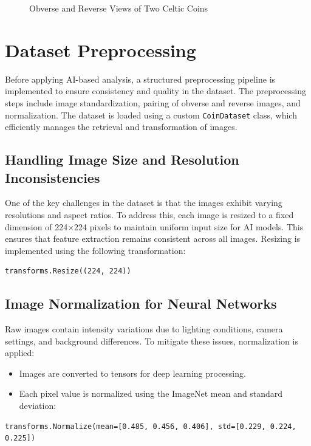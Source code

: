 \documentclass[nolibertine, english, algorithm, nomencl, minted]{ttlab-qualify}
\begin{document}
\begin{figure}[h]
    \caption{Obverse and Reverse Views of Two Celtic Coins}
    \label{fig:coin_matrix}
\end{figure}


\section{Dataset Preprocessing}

Before applying AI-based analysis, a structured preprocessing pipeline is implemented to 
ensure consistency and quality in the dataset. The preprocessing steps include image standardization, 
pairing of obverse and reverse images, and normalization. The dataset is loaded using a custom 
\texttt{CoinDataset} class, which efficiently manages the retrieval and transformation of images.

\subsection{Handling Image Size and Resolution Inconsistencies}
One of the key challenges in the dataset is that the images exhibit varying resolutions and aspect ratios. 
To address this, each image is resized to a fixed dimension of 224×224 pixels to maintain uniform input size 
for AI models. This ensures that feature extraction remains consistent across all images. Resizing is implemented 
using the following transformation:

\begin{footnotesize}
\begin{verbatim}
transforms.Resize((224, 224))
\end{verbatim}  
\end{footnotesize}


\subsection{Image Normalization for Neural Networks}
Raw images contain intensity variations due to lighting conditions, camera settings, 
and background differences. To mitigate these issues, normalization is applied:
\begin{itemize}
    \item Images are converted to tensors for deep learning processing.
    \item Each pixel value is normalized using the ImageNet mean and standard deviation:
\end{itemize}

\begin{footnotesize}
\begin{verbatim}
transforms.Normalize(mean=[0.485, 0.456, 0.406], std=[0.229, 0.224, 0.225])
\end{verbatim}
\end{footnotesize}
\end{document}
